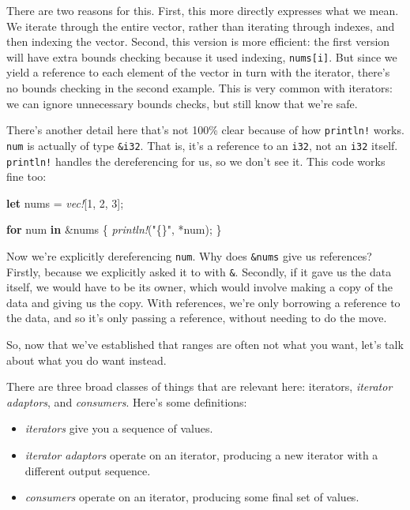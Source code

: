\documentclass[a4paper,]{book}
\newenvironment{Shaded}{\begin{snugshade}}{\end{snugshade}}
\newcommand{\KeywordTok}[1]{\textcolor[rgb]{0.13,0.29,0.53}{\textbf{{#1}}}}
\newcommand{\DecValTok}[1]{\textcolor[rgb]{0.00,0.00,0.81}{{#1}}}
\newcommand{\StringTok}[1]{\textcolor[rgb]{0.31,0.60,0.02}{{#1}}}
\newcommand{\PreprocessorTok}[1]{\textcolor[rgb]{0.56,0.35,0.01}{\textit{{#1}}}}
\newcommand{\NormalTok}[1]{{#1}}
\providecommand{\tightlist}{%
  \setlength{\itemsep}{0pt}\setlength{\parskip}{0pt}}
\begin{document}
There are two reasons for this. First, this more directly expresses what
we mean. We iterate through the entire vector, rather than iterating
through indexes, and then indexing the vector. Second, this version is
more efficient: the first version will have extra bounds checking
because it used indexing, \texttt{nums{[}i{]}}. But since we yield a
reference to each element of the vector in turn with the iterator,
there's no bounds checking in the second example. This is very common
with iterators: we can ignore unnecessary bounds checks, but still know
that we're safe.

There's another detail here that's not 100\% clear because of how
\texttt{println!} works. \texttt{num} is actually of type
\texttt{\&i32}. That is, it's a reference to an \texttt{i32}, not an
\texttt{i32} itself. \texttt{println!} handles the dereferencing for us,
so we don't see it. This code works fine too:

\begin{Shaded}
\begin{Highlighting}[]
\KeywordTok{let} \NormalTok{nums = }\PreprocessorTok{vec!}\NormalTok{[}\DecValTok{1}\NormalTok{, }\DecValTok{2}\NormalTok{, }\DecValTok{3}\NormalTok{];}

\KeywordTok{for} \NormalTok{num }\KeywordTok{in} \NormalTok{&nums \{}
    \PreprocessorTok{println!}\NormalTok{(}\StringTok{"\{\}"}\NormalTok{, *num);}
\NormalTok{\}}
\end{Highlighting}
\end{Shaded}

Now we're explicitly dereferencing \texttt{num}. Why does
\texttt{\&nums} give us references? Firstly, because we explicitly asked
it to with \texttt{\&}. Secondly, if it gave us the data itself, we
would have to be its owner, which would involve making a copy of the
data and giving us the copy. With references, we're only borrowing a
reference to the data, and so it's only passing a reference, without
needing to do the move.

So, now that we've established that ranges are often not what you want,
let's talk about what you do want instead.

There are three broad classes of things that are relevant here:
iterators, \emph{iterator adaptors}, and \emph{consumers}. Here's some
definitions:

\begin{itemize}
\tightlist
\item
  \emph{iterators} give you a sequence of values.
\item
  \emph{iterator adaptors} operate on an iterator, producing a new
  iterator with a different output sequence.
\item
  \emph{consumers} operate on an iterator, producing some final set of
  values.
\end{itemize}
\end{document}
